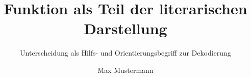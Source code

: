 \documentclass[openany,ngerman]{book}
\author{Max Mustermann}
\title{Funktion als Teil der literarischen Darstellung}
\subtitle{Unterscheidung als Hilfs- und Orientierungsbegriff zur Dekodierung}
\begin{document}
\frontmatter
\maketitle
\dedication{...\\ ...}
%


\mainmatter

%

\backmatter
%
\end{document}
